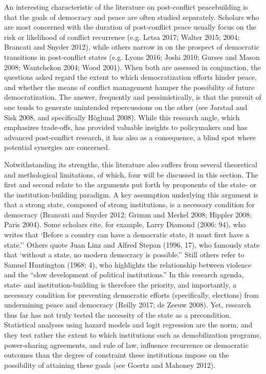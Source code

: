 \documentclass [11pt]{article}
\begin{document}
An interesting characteristic of the literature on post-conflict peacebuilding is that the goals of democracy and peace are often studied separately. Scholars who are most concerned with the duration of post-conflict peace usually focus on the risk or likelihood of conflict recurrence (e.g. Letsa 2017; Walter 2015; 2004; Brancati and Snyder 2012), while others narrow in on the prospect of democratic transitions in post-conflict states (e.g. Lyons 2016; Joshi 2010; Gurses and Mason 2008; Wantchekon 2004; Wood 2001). When both are assessed in conjunction, the questions asked regard the extent to which democratization efforts hinder peace, and whether the means of conflict management hamper the possibility of future democratization. The answer, frequently and pessimistically, is that the pursuit of one tends to generate unintended repercussions on the other (see Jarstad and Sisk 2008, and specifically Höglund 2008). While this research angle, which emphasizes trade-offs, has provided valuable insights to policymakers and has advanced post-conflict research, it has also as a consequence, a blind spot where potential synergies are concerned.

Notwithstanding its strengths, this literature also suffers from several theoretical and methological limitations, of which, four will be discussed in this section. The first and second relate to the arguments put forth by proponents of the state- or the institution-building paradigm. A key assumption underlying this argument is that a strong state, composed of strong institutions, is a necessary condition for democracy (Brancati and Snyder 2012; Grimm and Merkel 2008; Hippler 2008; Paris 2004). Some scholars cite, for example, Larry Diamond (2006: 94), who writes that `Before a country can have a democratic state, it must first have a state.'' Others quote Juan Linz and Alfred Stepan (1996, 17), who famously state that `without a state, no modern democracy is possible.'' Still others refer to Samuel Huntington (1968: 4), who highlights the relationship between violence and the ``slow development of political institutions.'' In this research agenda, state- and institution-building is therefore the priority, and importantly, a necessary condition for preventing democratic efforts (specifically, elections) from undermining peace and democracy (Reilly 2017; de Zeeuw 2008). Yet, research thus far has not truly tested the necessity of the state as a precondition. Statistical analyses using hazard models and logit regression are the norm, and they test rather the extent to which institutions such as demobilization programs, power-sharing agreements, and rule of law, influence recurrence or democratic outcomes than the degree of constraint these institutions impose on the possibility of attaining these goals (see Goertz and Mahoney 2012).
\end{document}
